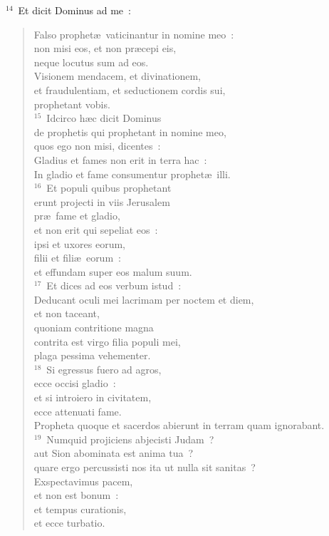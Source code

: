 ${}^{14}$~Et dicit Dominus ad me~: \begin{flushleft}\begin{verse}Falso prophet\ae\ vaticinantur in nomine meo~:\\ non misi eos, et non pr\ae cepi eis,\\ neque locutus sum ad eos.\\ Visionem mendacem, et divinationem,\\ et fraudulentiam, et seductionem cordis sui,\\ prophetant vobis.\\
${}^{15}$~Idcirco h\ae c dicit Dominus\\ de prophetis qui prophetant in nomine meo,\\ quos ego non misi, dicentes~:\\ Gladius et fames non erit in terra hac~:\\ In gladio et fame consumentur prophet\ae\ illi.\\
${}^{16}$~Et populi quibus prophetant\\ erunt projecti in viis Jerusalem\\ pr\ae\ fame et gladio,\\ et non erit qui sepeliat eos~:\\ ipsi et uxores eorum,\\ filii et fili\ae\ eorum~:\\ et effundam super eos malum suum.\\
${}^{17}$~Et dices ad eos verbum istud~:\\ Deducant oculi mei lacrimam per noctem et diem,\\ et non taceant,\\ quoniam contritione magna\\ contrita est virgo filia populi mei,\\ plaga pessima vehementer.\\
${}^{18}$~Si egressus fuero ad agros,\\ ecce occisi gladio~:\\ et si introiero in civitatem,\\ ecce attenuati fame.\\ Propheta quoque et sacerdos abierunt in terram quam ignorabant.\\
${}^{19}$~Numquid projiciens abjecisti Judam~?\\ aut Sion abominata est anima tua~?\\ quare ergo percussisti nos ita ut nulla sit sanitas~?\\ Exspectavimus pacem,\\ et non est bonum~:\\ et tempus curationis,\\ et ecce turbatio.\\

\end{verse}
\end{flushleft}

